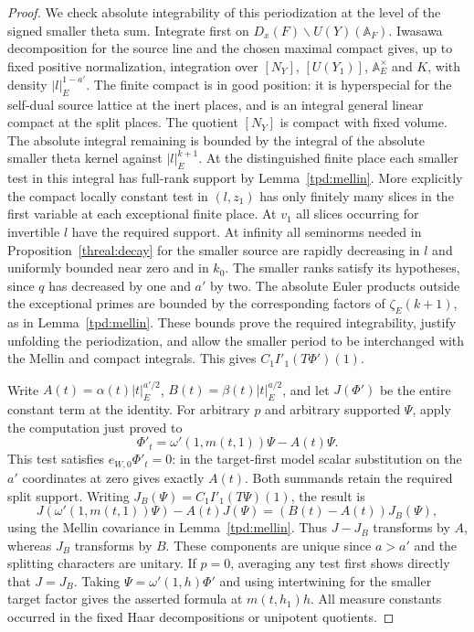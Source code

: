 \begin{proof}
We check absolute integrability of this periodization at the level
of the signed smaller theta sum. Integrate first on
\(D_x(F)\backslash U(Y)(\mathbb A_F)\). Iwasawa decomposition for
the source line and the chosen maximal compact gives, up to fixed
positive normalization, integration over \([N_Y]\),
\([U(Y_1)]\), \(\mathbb A_E^\times\) and \(K\), with density
\(|l|_E^{1-a'}\). The finite compact is in good position: it is
hyperspecial for the self-dual source lattice at the inert places,
and is an integral general linear compact at the split places.
The quotient \([N_Y]\) is compact with fixed volume. The absolute
integral remaining is bounded by the integral of the absolute
smaller theta kernel against \(|l|_E^{k+1}\). At the distinguished
finite place each smaller test in this integral has full-rank
support by Lemma~\ref{tpd:mellin}. More explicitly the compact
locally constant test in \((l,z_1)\) has only finitely many slices
in the first variable at each exceptional finite place. At \(v_1\)
all slices occurring for invertible \(l\) have the required support.
At infinity all seminorms needed in Proposition~\ref{threal:decay}
for the smaller source are rapidly decreasing in \(l\) and uniformly
bounded near zero and in \(k_0\). The smaller ranks satisfy its
hypotheses, since \(q\) has decreased by one and \(a'\) by two.
The absolute Euler products outside the exceptional primes are
bounded by the corresponding factors of \(\zeta_E(k+1)\), as
in Lemma~\ref{tpd:mellin}. These bounds prove the required
integrability, justify unfolding the periodization, and allow the
smaller period to be interchanged with the Mellin and compact
integrals. This gives \(C_1 I'_1(T\Phi')(1)\).

Write \(A(t)=\alpha(t)|t|_E^{a'/2}\),
\(B(t)=\beta(t)|t|_E^{a/2}\), and let \(J(\Phi')\) be the entire
constant term at the identity. For arbitrary \(p\) and arbitrary
supported \(\Psi\), apply the computation just proved to
\[
   \Phi'_t=\omega'(1,m(t,1))\Psi-A(t)\Psi .
\]
This test satisfies \(e_{W,0}\Phi'_t=0\): in the target-first
model scalar substitution on the \(a'\) coordinates at zero gives
exactly \(A(t)\). Both summands retain the required split support.
Writing \(J_B(\Psi)=C_1 I'_1(T\Psi)(1)\), the result is
\[
 J(\omega'(1,m(t,1))\Psi)-A(t)J(\Psi)
                   =(B(t)-A(t))J_B(\Psi),
\]
using the Mellin covariance in Lemma~\ref{tpd:mellin}. Thus
\(J-J_B\) transforms by \(A\), whereas \(J_B\) transforms by \(B\).
These components are unique since \(a>a'\) and the splitting
characters are unitary. If \(p=0\), averaging any test first shows
directly that \(J=J_B\). Taking \(\Psi=\omega'(1,h)\Phi'\) and
using intertwining for the smaller target factor gives the asserted
formula at \(m(t,h_1)h\). All measure constants occurred in the fixed
Haar decompositions or unipotent quotients.
\end{proof}

